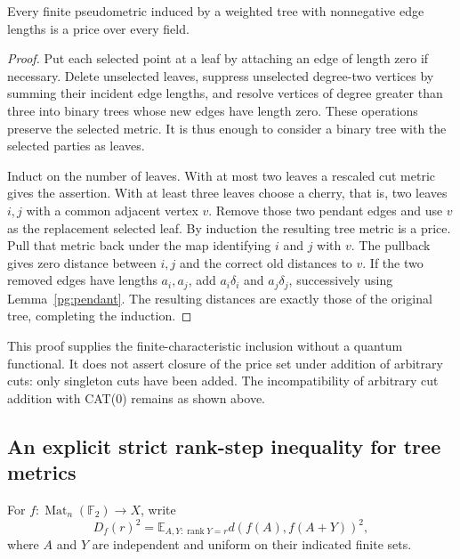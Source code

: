 \begin{theorem}
\label{pg:tree-all}
Every finite pseudometric induced by a weighted tree with nonnegative edge
lengths is a price over every field.
\end{theorem}
\begin{proof}
Put each selected point at a leaf by attaching an edge of length zero if
necessary. Delete unselected leaves, suppress unselected degree-two
vertices by summing their incident edge lengths, and resolve vertices of
degree greater than three into binary trees whose new edges have length
zero. These operations preserve the selected metric. It is thus enough
to consider a binary tree with the selected parties as leaves.

Induct on the number of leaves. With at most two leaves a rescaled cut
metric gives the assertion. With at least three leaves choose a cherry,
that is, two leaves $i,j$ with a common adjacent vertex $v$. Remove those
two pendant edges and use $v$ as the replacement selected leaf. By
induction the resulting tree metric is a price. Pull that metric back
under the map identifying $i$ and $j$ with $v$. The pullback gives zero
distance between $i,j$ and the correct old distances to $v$. If the two
removed edges have lengths $a_i,a_j$, add $a_i\delta_i$ and
$a_j\delta_j$, successively using Lemma~\ref{pg:pendant}. The resulting
distances are exactly those of the original tree, completing the induction.
\end{proof}

This proof supplies the finite-characteristic inclusion without a quantum
functional. It does not assert closure of the price set under addition
of arbitrary cuts: only singleton cuts have been added. The incompatibility
of arbitrary cut addition with CAT(0) remains as shown above.

\subsection{An explicit strict rank-step inequality for tree metrics}

For $f:\operatorname{Mat}_n(\mathbb F_2)\to X$, write
\[
 D_f(r)^2=\mathbb E_{A,Y:\operatorname{rank}Y=r}
 d(f(A),f(A+Y))^2,
\]
where $A$ and $Y$ are independent and uniform on their indicated finite
sets.

